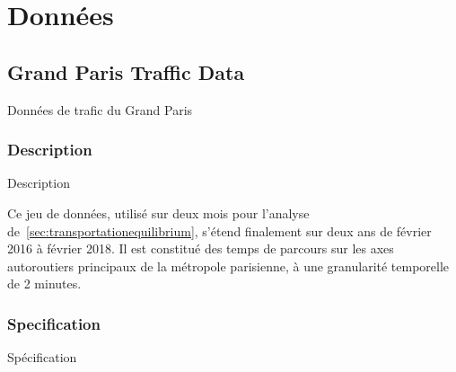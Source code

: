 \chapter{Données}



\label{app:data} %












\section{Grand Paris Traffic Data}{Données de trafic du Grand Paris}


\subsection{Description}{Description}

Ce jeu de données, utilisé sur deux mois pour l'analyse de~\ref{sec:transportationequilibrium}, s'étend finalement sur deux ans de février 2016 à février 2018. Il est constitué des temps de parcours sur les axes autoroutiers principaux de la métropole parisienne, à une granularité temporelle de 2 minutes.

\subsection{Specification}{Spécification}

